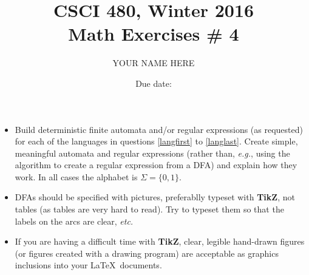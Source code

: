 \documentclass{article}
\title{CSCI 480, Winter 2016\\Math Exercises \# 4}
\author{YOUR NAME HERE}
\date{Due date:  }
\begin{document}
\maketitle

\begin{itemize}
  \item
Build deterministic finite automata and/or regular expressions (as
requested) for each of the languages in questions \ref{langfirst} to
\ref{langlast}.  Create simple, meaningful automata and regular
expressions (rather than, {\em e.g.}, using the algorithm to create a
regular expression from a DFA) and explain how they work.  In all
cases the alphabet is $\Sigma = \{0,1\}$.
\item
DFAs should be specified with pictures, preferablly
typeset with {\bf TikZ}, not tables
(as tables are very hard to read).  Try to typeset them so that the
labels on the arcs are clear, {\em etc.}
\item
If you are having a difficult time with {\bf TikZ}, clear, legible
hand-drawn figures (or figures created with a drawing program)
are acceptable as graphics inclusions into your \LaTeX\ 
documents. 
\end{itemize}
\end{document}

